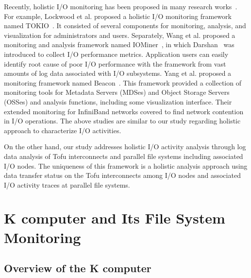 \documentclass{jhps}
\begin{document}
Recently, holistic I/O monitoring has been proposed
in many research works~\cite{lockwood:cug18,wang:cluster18,yang:nsdi2019}.
For example, Lockwood et al. proposed a holistic I/O monitoring framework
named TOKIO~\cite{lockwood:cug18}.
It consisted of several components for monitoring, analysis, and visualization
for administrators and users.
Separately, Wang et al. proposed a monitoring and analysis framework
named IOMiner~\cite{wang:cluster18}, in which Darshan~\cite{darshan:web}
was introduced to collect I/O performance metrics.
Application users can easily identify root cause of
poor I/O performance with the framework from vast amounts of log data
associated with I/O subsystems.
Yang et al. proposed a monitoring framework named Beacon~\cite{yang:nsdi2019}.
This framework provided a collection of monitoring tools for Metadata Servers (MDSes)
and Object Storage Servers (OSSes) and analysis functions,
including some visualization interface.
Their extended monitoring for InfiniBand networks covered to
find network contention in I/O operations.
The above studies are similar to our study regarding holistic approach
to characterize I/O activities.

On the other hand, our study addresses holistic I/O activity analysis
through log data analysis of Tofu interconnects and parallel file systems
including associated I/O nodes.
The uniqueness of this framework is a holistic analysis approach
using data transfer status on the Tofu interconnects among I/O nodes
and associated I/O activity traces at parallel file systems.

\section{K computer and Its File System Monitoring}\label{sec:K_OVERVIEW}
\label{sec:K_COMP}

\subsection{Overview of the K computer}
\label{ssec:K_COMP_OVERVIEW}
\end{document}
